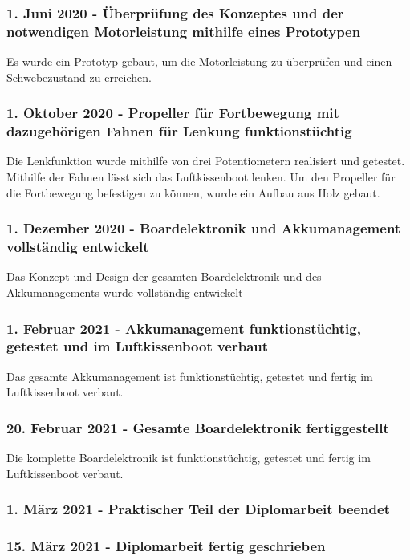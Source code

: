 \subsubsection*{1. Juni 2020 - Überprüfung des Konzeptes und der notwendigen Motorleistung mithilfe eines Prototypen}
Es wurde ein Prototyp gebaut, um die Motorleistung zu überprüfen und einen Schwebezustand zu erreichen.

\subsubsection*{1. Oktober 2020 - Propeller für Fortbewegung mit dazugehörigen Fahnen für Lenkung funktionstüchtig}
Die Lenkfunktion wurde mithilfe von drei Potentiometern realisiert und getestet. Mithilfe der Fahnen lässt sich das Luftkissenboot lenken. Um den Propeller für 
die Fortbewegung befestigen zu können, wurde ein Aufbau aus Holz gebaut.

\subsubsection*{1. Dezember 2020 - Boardelektronik und  Akkumanagement vollständig entwickelt}
Das Konzept und Design der gesamten Boardelektronik und des Akkumanagements wurde  vollständig entwickelt
\subsubsection*{1. Februar 2021 - Akkumanagement funktionstüchtig, getestet und im Luftkissenboot verbaut}
Das gesamte Akkumanagement ist funktionstüchtig, getestet und fertig im Luftkissenboot verbaut. 
\subsubsection*{20. Februar 2021 - Gesamte Boardelektronik fertiggestellt}
Die komplette Boardelektronik ist funktionstüchtig, getestet und fertig im Luftkissenboot verbaut. 

\subsubsection*{1. März 2021 - Praktischer Teil der Diplomarbeit beendet}

\subsubsection*{15. März 2021 - Diplomarbeit fertig geschrieben}

